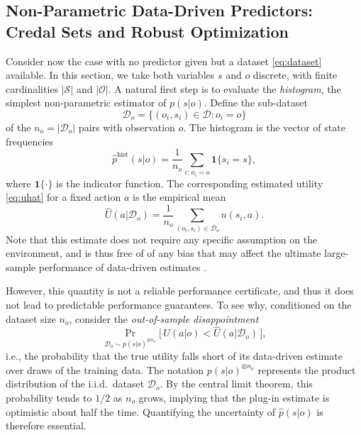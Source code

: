 \documentclass[journal]{IEEEtran}
\theoremstyle{definition}
\theoremstyle{remark}
\newcommand{\Sset}{\mathcal{S}}
\newcommand{\Oset}{\mathcal{O}}
\newcommand{\Dset}{\mathcal{D}}
\begin{document}
\subsection{Non-Parametric Data-Driven Predictors: Credal Sets and Robust Optimization}
\label{sec:npar}
Consider now the case with no predictor given but a dataset \eqref{eq:dataset}
available. In this section, we take both variables  $s$ and $o$ discrete, with finite cardinalities
$|\Sset|$ and $|\Oset|$. A natural first step is to evaluate the \emph{histogram}, the
simplest non-parametric estimator of $p(s| o)$. Define the sub-dataset
\begin{equation}
\label{eq:subdataset}
\Dset_o=\{(o_i,s_i)\in\Dset : o_i=o\}
\end{equation}
of the $n_o=|\Dset_o|$ pairs with observation $o$. The histogram is the
vector of state frequencies
\begin{equation}
\label{eq:emppost}
\hat p^{\text{hist}}(s| o)=\frac{1}{n_o}\sum_{i:\,o_i=o}\mathbf 1\{s_i=s\},
\end{equation}
where $\mathbf 1\{\cdot\}$ is the indicator function. The corresponding
estimated utility \eqref{eq:uhat} for a fixed action $a$ is the empirical mean
\begin{equation}
\label{eq:uhathist}
\hat U(a|\Dset_o) = \frac{1}{n_o} \sum_{(o_i,s_i) \in \Dset_o} u(s_i,a).
\end{equation} { Note that this estimate does not require any specific assumption on the environment, and is thus free of of any bias that may affect the ultimate large-sample performance of data-driven estimates \cite{simeone2022ml}.}


However, this quantity is not a reliable performance certificate, and thus it does not lead to predictable performance guarantees. To see why, conditioned on the dataset size $n_o$, consider
the \emph{out-of-sample disappointment} \cite{bental2013robust}
\begin{equation}
\label{eq:disappointment}
\Pr_{\Dset_o\sim p(s| o)^{\otimes n_o}}\!\bigl[\,U(a| o) < \hat U(a|\Dset_o)\,\bigr],
\end{equation}
i.e., the probability that the true utility falls short of its data-driven
estimate over draws of the training data. The notation $p(s| o)^{\otimes n_o}$ represents 
the product distribution of the i.i.d.\ dataset $\Dset_o$. By the central
limit theorem, this probability tends to $1/2$ as $n_o$ grows, implying that the plug-in
estimate is optimistic about half the time. Quantifying the uncertainty of
$\hat p(s| o)$ is therefore essential.
\end{document}
